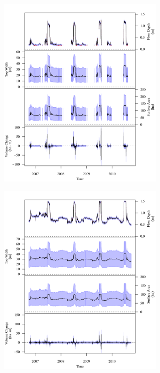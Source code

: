 \begin{linenumbers}
\subfiguretop
\begin{landscape}
	\begin{figure}
		\begin{subfigure}{0.7\textwidth}
			\centering
			\includegraphics[width=0.9\textwidth]{"Figures/Results_DSR/Stochastic/G TS F"}
		\end{subfigure}%
		\begin{subfigure}{0.7\textwidth}
			\centering
			\includegraphics[width=0.9\textwidth]{"Figures/Results_DSR/Stochastic/G TS G"}

\end{subfigure}
\end{figure}
\end{landscape}
\end{linenumbers}
